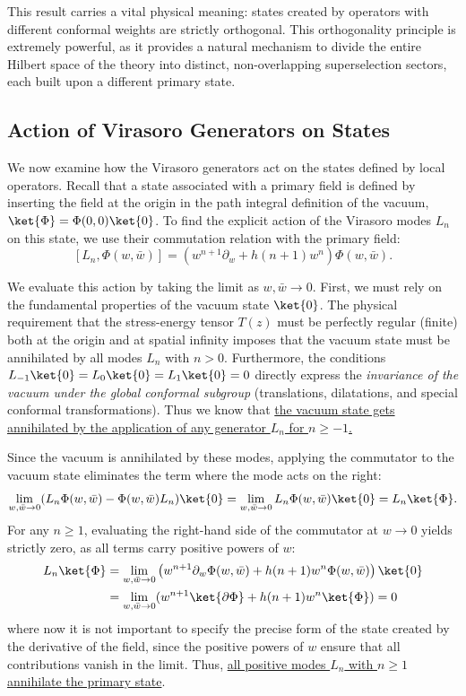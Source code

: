 This result carries a vital physical meaning: states created by operators with different conformal weights are strictly orthogonal. This orthogonality principle is extremely powerful, as it provides a natural mechanism to divide the entire Hilbert space of the theory into distinct, non-overlapping superselection sectors, each built upon a different primary state.

\subsection{Action of Virasoro Generators on States}

We now examine how the Virasoro generators act on the states defined by local operators. Recall that a state associated with a primary field is defined by inserting the field at the origin in the path integral definition of the vacuum, \(\ket{\Phi} = \Phi(0,0)\ket{0}\). To find the explicit action of the Virasoro modes \(L_n\) on this state, we use their commutation relation with the primary field:
\[
    [L_n, \Phi(w,\bar{w})] = (w^{n+1}\partial_w + h(n+1)w^n)\Phi(w,\bar{w}).
\]

We evaluate this action by taking the limit as \(w, \bar{w} \to 0\). First, we must rely on the fundamental properties of the vacuum state \(\ket{0}\). The physical requirement that the stress-energy tensor \(T(z)\) must be perfectly regular (finite) both at the origin and at spatial infinity imposes that the vacuum state must be annihilated by all modes \(L_n\) with \(n > 0\). Furthermore, the conditions \(L_{-1}\ket{0} = L_0\ket{0} = L_1\ket{0} = 0\) directly express the \textit{invariance of the vacuum under the global conformal subgroup} (translations, dilatations, and special conformal transformations). Thus we know that \uline{the vacuum state gets annihilated by the application of any generator \(L_n\) for \(n \geq -1\).}

Since the vacuum is annihilated by these modes, applying the commutator to the vacuum state eliminates the term where the mode acts on the right:
\[
    \lim_{w, \bar{w} \to 0} (L_n \Phi(w,\bar{w}) - \Phi(w,\bar{w}) L_n) \ket{0} = \lim_{w, \bar{w} \to 0} L_n \Phi(w,\bar{w}) \ket{0} = L_n \ket{\Phi}.
\]
For any \(n \ge 1\), evaluating the right-hand side of the commutator at \(w \to 0\) yields strictly zero, as all terms carry positive powers of \(w\):
\[
    \begin{aligned}
        L_n \ket{\Phi} & = \lim_{w, \bar{w} \to 0} \left( w^{n+1} \partial_w \Phi(w,\bar{w}) + h(n+1)w^n \Phi(w,\bar{w}) \right) \ket{0} \\
                       & = \lim_{w, \bar{w} \to 0} (w^{n+1} \ket{\partial \Phi} + h(n+1)w^n \ket{\Phi}) = 0
    \end{aligned}
\]
where now it is not important to specify the precise form of the state created by the derivative of the field, since the positive powers of \(w\) ensure that all contributions vanish in the limit. Thus, \uline{all positive modes \(L_n\) with \(n \ge 1\) annihilate the primary state}.

